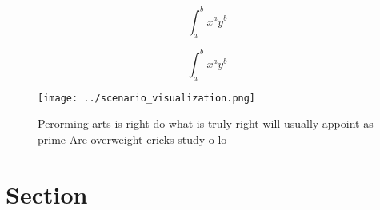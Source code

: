 \documentclass[a4paper]{article}
\begin{document}
\[ \int_{a}^{b}{x^{a}y^{b}} \]

\[ \int_{a}^{b}{x^{a}y^{b}} \]

\begin{figure}
\centering
\texttt{[image: ../scenario\_visualization.png]}
\caption{Perorming arts is right do what is truly right will usually appoint as prime Are overweight cricks study o lo
}
\end{figure}
 
\section{Section}
\end{document}
